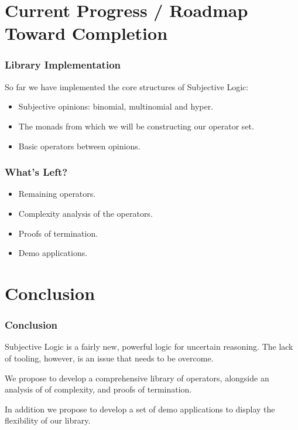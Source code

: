 \documentclass{beamer}
\begin{document}
\section{Current Progress / Roadmap Toward Completion}

\begin{frame}
\frametitle{Library Implementation}

So far we have implemented the core structures of Subjective Logic:

\begin{itemize}
  \item Subjective opinions: binomial, multinomial and hyper.
  \item The monads from which we will be constructing our operator set.
  \item Basic operators between opinions.
\end{itemize}

\end{frame}


\begin{frame}
\frametitle{What's Left?}

\begin{itemize}
  \item Remaining operators.
  \item Complexity analysis of the operators.
  \item Proofs of termination.
  \item Demo applications.
\end{itemize}

\end{frame}

%
%

\section{Conclusion}

\begin{frame}
\frametitle{Conclusion}

Subjective Logic is a fairly new, powerful logic for uncertain reasoning. The lack
of tooling, however, is an issue that needs to be overcome.

We propose to develop a comprehensive library of operators, alongside an analysis of
of complexity, and proofs of termination.

In addition we propose to develop a set of demo applications to display the flexibility
of our library.
\end{frame}
\end{document}
